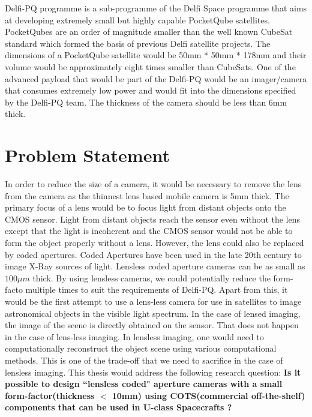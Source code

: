 Delfi-PQ programme is a sub-programme of the Delfi Space programme that aims at developing extremely small but highly capable PocketQube satellites. PocketQubes are an order of magnitude smaller than the well known CubeSat standard which formed the basis of previous Delfi satellite projects. The dimensions of a PocketQube satellite would be 50mm * 50mm * 178mm and their volume would be approximately eight times smaller than CubeSats. One of the advanced payload that would be part of the Delfi-PQ would be an imager/camera that consumes extremely low power and would fit into the dimensions specified by the Delfi-PQ team. The thickness of the camera should be less than 6mm thick.
 
 
\section{Problem Statement}
In order to reduce the size of a camera, it would be necessary to remove the lens from the camera as the thinnest lens based mobile camera is 5mm thick. The primary focus of a lens would be to focus light from distant objects onto the CMOS sensor. Light from distant objects reach the sensor even without the lens except that the light is incoherent and the CMOS sensor would not be able to form the object properly without a lens. However, the lens could also be replaced by coded apertures. Coded Apertures have been used in the late 20th century to image X-Ray sources of light. Lensless coded aperture cameras can be as small as $100 \mu m$ thick. By using lensless cameras, we could potentially reduce the form-facto multiple times to suit the requirements of Delfi-PQ. Apart from this, it would be the first attempt to use a lens-less camera for use in satellites to image astronomical objects in the visible light spectrum. In the case of lensed imaging, the image of the scene is directly obtained on the sensor. That does not happen in the case of lens-less imaging. In lensless imaging, one would need to computationally reconstruct the object scene using various computational methods. This is one of the trade-off that we need to sacrifice in the case of lensless imaging.
This thesis would address the following research question:
\textbf{Is it possible to design ``lensless coded" aperture cameras with a small form-factor(thickness $<$ 10mm) using COTS(commercial off-the-shelf) components that can be used in U-class Spacecrafts ?}


